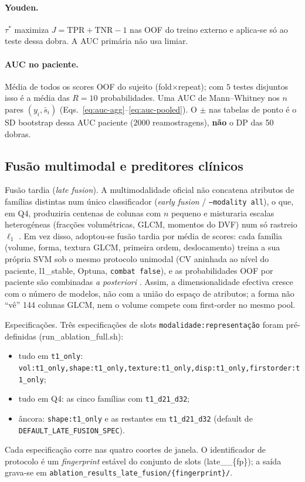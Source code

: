 \documentclass[review]{elsarticle}
\newcommand{\code}[1]{\texttt{#1}}
\begin{document}
\paragraph{Youden.}
$\tau^{*}$ maximiza $J=\mathrm{TPR}+\mathrm{TNR}-1$ nas OOF do treino externo e aplica-se só ao teste dessa dobra.
A AUC primária não usa limiar.

\paragraph{AUC no paciente.}
Média de todos os scores OOF do sujeito (fold$\times$repeat); com $5$ testes disjuntos isso é a média das $R=10$ probabilidades.
Uma AUC de Mann--Whitney nos $n$ pares $(y_i,\bar{s}_i)$ (Eqs.~\ref{eq:auc-agg}--\ref{eq:auc-pooled}).
O $\pm$ nas tabelas de ponto é o SD bootstrap dessa AUC paciente ($2000$ reamostragens), \textbf{não} o DP das 50 dobras.

\subsection{Fusão multimodal e preditores clínicos}
\label{sec:fusao}

Fusão tardia (\emph{late fusion}). A multimodalidade oficial não concatena atributos de famílias distintas num único classificador (\emph{early fusion} / \code{--modality all}), o que, em Q4, produziria centenas de colunas com $n$ pequeno e misturaria escalas heterogéneas (fracções volumétricas, GLCM, momentos do DVF) num só rastreio $\ell_1$ \cite{kittler-1998,kuncheva-2004}. Em vez disso, adoptou-se fusão tardia por média de scores: cada família (volume, forma, textura GLCM, primeira ordem, deslocamento) treina a sua própria SVM sob o mesmo protocolo unimodal (CV aninhada ao nível do paciente, l1\_stable, Optuna, \code{combat false}), e as probabilidades OOF por paciente são combinadas \emph{a posteriori} \cite{kittler-1998,dietterich-2000}. Assim, a dimensionalidade efectiva cresce com o número de modelos, não com a união do espaço de atributos; a forma não “vê” 144 colunas GLCM, nem o volume compete com first-order no mesmo pool.

Especificações. Três especificações de slots \code{modalidade:representação} foram pré-definidas (run\_ablation\_full.sh): \begin{itemize} \item tudo em \code{t1\_only}: \code{vol:t1\_only,shape:t1\_only,texture:t1\_only,disp:t1\_only,firstorder:t1\_only}; \item tudo em Q4: as cinco famílias com \code{t1\_d21\_d32}; \item âncora: \code{shape:t1\_only} e as restantes em \code{t1\_d21\_d32} (default de \code{DEFAULT\_LATE\_FUSION\_SPEC}). \end{itemize} Cada especificação corre nas quatro coortes de janela. O identificador de protocolo é um \emph{fingerprint} estável do conjunto de slots (late\_\_\{fp\}); a saída grava-se em \code{ablation\_results\_late\_fusion/\{fingerprint\}/}.
\end{document}
